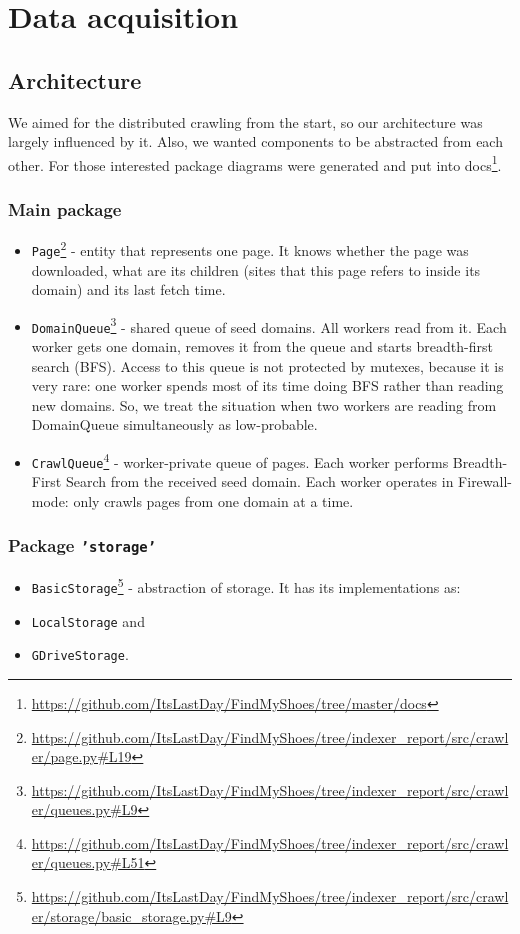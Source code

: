 \section{Data acquisition}
    
\subsection{Architecture}
    We aimed for the distributed crawling from the start, so our architecture was largely influenced by it. Also, we wanted com\-po\-nents to be abstracted from each other. For those interested package diagrams were generated and put into docs\footnote{\url{https://github.com/ItsLastDay/FindMyShoes/tree/master/docs}}.
    
    \subsubsection{Main package}

    \begin{itemize}
    \item \texttt{Page}\footnote{\url{https://github.com/ItsLastDay/FindMyShoes/tree/indexer_report/src/crawler/page.py\#L19}} - entity that represents one page. It knows whe\-ther the page was downloaded, what are its children (sites that this page refers to inside its domain) and its last fetch time.
    
    \item \texttt{DomainQueue}\footnote{\url{https://github.com/ItsLastDay/FindMyShoes/tree/indexer_report/src/crawler/queues.py\#L9}} - shared queue of seed domains. All workers read from it. Each worker gets one domain, re\-mo\-ves it from the queue and starts breadth-first search (BFS). 
    Access to this queue is not protected by mutexes, because it is very rare: one worker spends most of its time doing BFS rather than reading new domains. So, we treat the situation when two workers are reading from DomainQueue simultaneously as low-probable.
    
    \item \texttt{CrawlQueue}\footnote{\url{https://github.com/ItsLastDay/FindMyShoes/tree/indexer_report/src/crawler/queues.py\#L51}} - worker-private queue of pages. Each worker performs Breadth-First Search from the received seed domain. Each worker operates in Firewall-mode: only crawls pages from one domain at a time.
    \end{itemize}
    
    \subsubsection{Package \texttt{'storage'}}
    \begin{itemize}
    \item \texttt{BasicStorage}\footnote{\url{https://github.com/ItsLastDay/FindMyShoes/tree/indexer_report/src/crawler/storage/basic_storage.py\#L9}} - abstraction of storage. It has its im\-ple\-men\-ta\-tions as:
    \item \texttt{LocalStorage} and
    \item \texttt{GDriveStorage}.
    \end{itemize}
    
